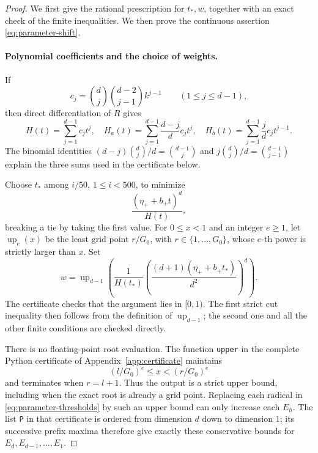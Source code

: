 \begin{proof}
We first give the rational prescription for $t_*,w$, together with
an exact check of the finite inequalities.  We then prove the
continuous assertion \eqref{eq:parameter-shift}.

\paragraph{Polynomial coefficients and the choice of weights.}
If
\[
 c_j=\binom dj\binom{d-2}{j-1}k^{j-1}\qquad(1\le j\le d-1),
\]
then direct differentiation of $R$ gives
\begin{equation}
 H(t)=\sum_{j=1}^{d-1}c_jt^j,\quad
 H_a(t)=\sum_{j=1}^{d-1}\frac{d-j}{d}c_jt^j,\quad
 H_b(t)=\sum_{j=1}^{d-1}\frac jdc_jt^{j-1}.
 \label{eq:parameter-polynomials}
\end{equation}
The binomial identities
$(d-j)\binom dj/d=\binom{d-1}j$ and
$j\binom dj/d=\binom{d-1}{j-1}$ explain the three sums used in the
certificate below.

Choose $t_*$ among $i/50$, $1\le i<500$, to minimize
\[
 \frac{(\eta_++b_+t)^d}{H(t)},
\]
breaking a tie by taking the first value.  For $0\le x<1$ and an
integer $e\ge1$, let $\operatorname{up}_e(x)$ be the least grid
point $r/G_0$, with $r\in\{1,\ldots,G_0\}$, whose $e$-th power is
strictly larger than $x$.
Set
\begin{equation}
 w=\operatorname{up}_{d-1}\left(
 \frac{1}{H(t_*)}
 \left(\frac{(d+1)(\eta_++b_+t_*)}{d^2}\right)^d
 \right).
 \label{eq:parameter-prescription}
\end{equation}
The certificate checks that the argument lies in $[0,1)$.
The first strict cut inequality then follows from the definition of
$\operatorname{up}_{d-1}$; the second one and all the other finite
conditions are checked directly.

There is no floating-point root evaluation.  The function
\texttt{upper} in the complete Python certificate of
Appendix~\ref{app:certificate} maintains
\[
 (l/G_0)^e\le x<(r/G_0)^e
\]
and terminates when $r=l+1$.  Thus the output is a strict upper
bound, including when the exact root is already a grid point.
Replacing each radical in \eqref{eq:parameter-thresholds} by such an
upper bound can only increase each $E_h$.  The list \texttt{P}
in that certificate is ordered from dimension $d$ down to dimension $1$; its
successive prefix maxima therefore give exactly these conservative
bounds for $E_d,E_{d-1},\ldots,E_1$.




\end{proof}
